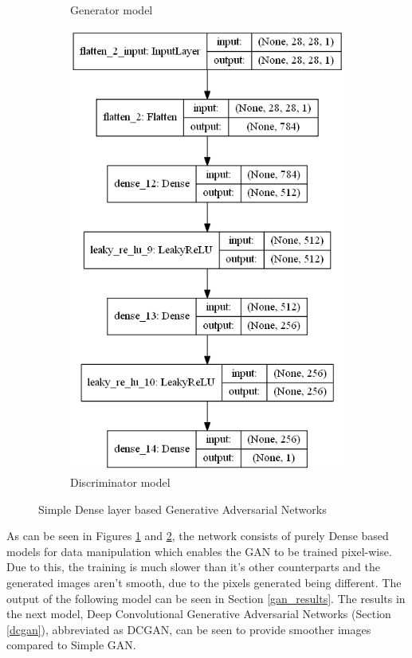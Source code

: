 \documentclass[conference]{IEEEtran}
\begin{document}
\begin{figure}
\begin{subfigure}[b]{\columnwidth}
         \caption{Generator model}
         \label{fig:gen_gan}
     \end{subfigure}
     \hfill
     \begin{subfigure}[b]{\columnwidth}
         \centering
         \includegraphics[width=\linewidth]{discriminator_gan.png}
         \caption{Discriminator model}
         \label{fig:dis_gan}
     \end{subfigure}
        \caption{Simple Dense layer based Generative Adversarial Networks}
        \label{fig:gan_mod}
\end{figure}

As can be seen in Figures \ref{fig:gen_gan} and \ref{fig:dis_gan}, the network consists of purely Dense based models for data manipulation which enables the GAN to be trained pixel-wise. Due to this, the training is much slower than it's other counterparts and the generated images aren't smooth, due to the pixels generated being different. The output of the following model can be seen in Section \ref{gan_results}.
The results in the next model, Deep Convolutional Generative Adversarial Networks (Section \ref{dcgan}), abbreviated as DCGAN, can be seen to provide smoother images compared to Simple GAN. 
\end{document}
